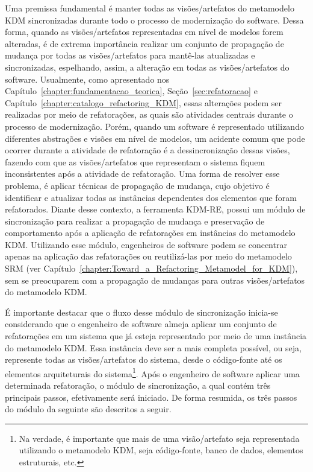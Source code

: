Uma premissa fundamental é manter todas as visões/artefatos do metamodelo KDM sincronizadas durante todo o processo de modernização do software. Dessa forma, quando as visões/artefatos representadas em nível de modelos forem alteradas, é de extrema importância realizar um conjunto de propagação de mudança por todas as visões/artefatos para mantê-las atualizadas e sincronizadas, espelhando, assim, a alteração em todas as visões/artefatos do software. Usualmente, como apresentado nos Capítulo~\ref{chapter:fundamentacao_teorica}, Seção~\ref{sec:refatoracao} e Capítulo~\ref{chapter:catalogo_refactoring_KDM}, essas alterações podem ser realizadas por meio de refatorações, as quais são atividades centrais durante o processo de modernização. Porém, quando um software é representado utilizando diferentes abstrações e visões em nível de modelos, um acidente comum que pode ocorrer durante a atividade de refatoração é a dessincronização dessas visões, fazendo com que as visões/artefatos que representam o sistema fiquem inconsistentes após a atividade de refatoração. Uma forma de resolver esse problema, é aplicar técnicas de propagação de mudança, cujo objetivo é identificar e atualizar todas as instâncias dependentes dos elementos que foram refatorados. %
Diante desse contexto, a ferramenta KDM-RE, possui um módulo de sincronização para realizar a propagação de mudança e preservação de comportamento após a aplicação de refatorações em instâncias do metamodelo KDM. Utilizando esse módulo, engenheiros de software podem se concentrar apenas na aplicação das refatorações ou reutilizá-las por meio do metamodelo SRM (ver Capítulo~\ref{chapter:Toward_a_Refactoring_Metamodel_for_KDM}), sem se preocuparem com a propagação de mudanças para outras visões/artefatos do metamodelo KDM. 

É importante destacar que o fluxo desse módulo de sincronização inicia-se considerando que o engenheiro de software almeja aplicar um conjunto de refatorações em um sistema que já esteja representado por meio de uma instância do metamodelo KDM. Essa instância deve ser a mais completa possível, ou seja, represente todas as visões/artefatos do sistema, desde o código-fonte até os elementos arquiteturais do sistema\footnote{Na verdade, é importante que mais de uma visão/artefato seja representada utilizando o metamodelo KDM, seja código-fonte, banco de dados, elementos estruturais, etc.}. Após o engenheiro de software aplicar uma determinada refatoração, o módulo de sincronização, a qual contém três principais passos, efetivamente será iniciado. De forma resumida, os três passos do módulo da seguinte são descritos a seguir. 

